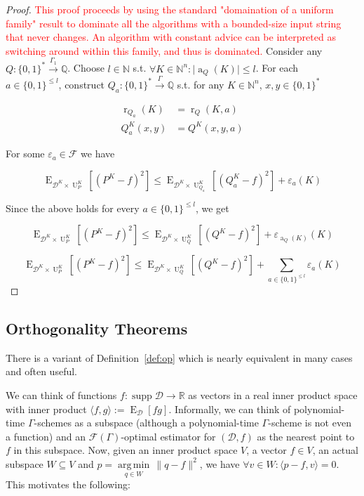 \documentclass[11pt]{article}
\numberwithin{equation}{section}
\theoremstyle{definition}
\theoremstyle{plain}
\newcommand{\Bool}{\{0,1\}}
\newcommand{\Words}{{\Bool^*}}
\DeclareMathOperator{\Supp}{supp}
\DeclareMathOperator{\E}{E}
\DeclareMathOperator{\R}{r}
\DeclareMathOperator{\A}{a}
\DeclareMathOperator{\Un}{U}
\newcommand{\Argmin}[1]{\underset{#1}{\operatorname{arg\,min}}\,}
\newcommand{\Nats}{\mathbb{N}}
\newcommand{\Rats}{\mathbb{Q}}
\newcommand{\Reals}{\mathbb{R}}
\newcommand{\Abs}[1]{\lvert #1 \rvert}
\newcommand{\Norm}[1]{\lVert #1 \rVert}
\newcommand{\Chev}[1]{\langle #1 \rangle}
\newcommand{\Dist}{\mathcal{D}}
\newcommand{\Fall}{\mathcal{F}}
\newcommand{\EG}{\Fall(\Gamma)}
\newcommand{\Scheme}{\xrightarrow{\Gamma}}
\begin{document}
\begin{proof}
\textcolor{red}{This proof proceeds by using the standard "domaination of a uniform family" result to dominate all the algorithms with a bounded-size input string that never changes. An algorithm with constant advice can be interpreted as switching around within this family, and thus is dominated.}
Consider any ${Q: \Words \xrightarrow{\Gamma_1} \Rats}$. Choose ${l \in \Nats}$ s.t. ${\forall K \in \Nats^n: \Abs{\A_Q(K)} \leq l}$. For each\\ $a \in \Bool^{\leq l}$, construct ${Q_a: \Words \Scheme \Rats}$ s.t. for any ${K \in \Nats^n}$, ${x,y \in \Words}$

\begin{align*}
\R_{Q_a}(K) &= \R_Q(K,a) \\
Q_a^K(x,y) &= Q^K(x,y,a) 
\end{align*}

For some ${\varepsilon_a \in \Fall}$ we have

\[\E_{\Dist^{K} \times \Un_P^{K}}[(P^{K} - f)^2] \leq \E_{\Dist^{K} \times \Un_{Q_a}^{K}}[(Q_a^{K} - f)^2] + \varepsilon_a(K)\]

Since the above holds for every ${a \in \Bool^{\leq l}}$, we get 

\[\E_{\Dist^{K} \times \Un_P^{K}}[(P^{K} - f)^2] \leq \E_{\Dist^{K} \times \Un_{Q}^{K}}[(Q^{K} - f)^2] + \varepsilon_{\A_Q(K)}(K)\]

\[\E_{\Dist^{K} \times \Un_P^{K}}[(P^{K} - f)^2] \leq \E_{\Dist^{K} \times \Un_{Q}^{K}}[(Q^{K} - f)^2] + \sum_{a \in \Bool^{\leq l}} \varepsilon_a(K)\]

\end{proof}

\subsection{Orthogonality Theorems}

There is a variant of Definition~\ref{def:op} which is nearly equivalent in many cases and often useful.

We can think of functions $f: \Supp \Dist \rightarrow \Reals$ as vectors in a real inner product space with inner product $\Chev{f,g}:=\E_\Dist[fg]$. Informally, we can think of polynomial-time $\Gamma$-schemes as a subspace (although a polynomial-time $\Gamma$-scheme is not even a function) and an $\EG$-optimal estimator for $(\Dist,f)$ as the nearest point to $f$ in this subspace. Now, given an inner product space $V$, a vector $f \in V$, an actual subspace $W \subseteq V$ and $p = \Argmin{q \in W} \Norm{q - f}^2$, we have $\forall v \in W: \Chev{p-f,v}=0$. This motivates the following:
\end{document}
